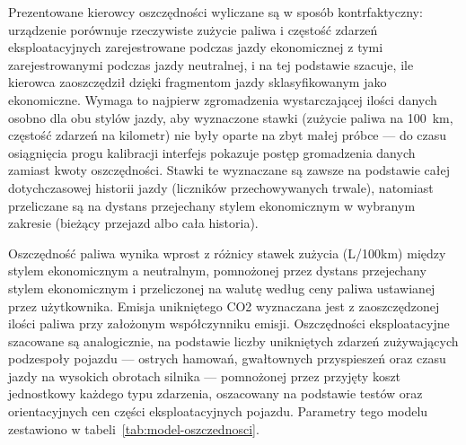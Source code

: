 Prezentowane kierowcy oszczędności wyliczane są w sposób kontrfaktyczny:
urządzenie porównuje rzeczywiste zużycie paliwa i częstość zdarzeń
eksploatacyjnych zarejestrowane podczas jazdy ekonomicznej z tymi
zarejestrowanymi podczas jazdy neutralnej, i na tej podstawie szacuje, ile
kierowca zaoszczędził dzięki fragmentom jazdy sklasyfikowanym jako
ekonomiczne. Wymaga to najpierw zgromadzenia wystarczającej ilości danych
osobno dla obu stylów jazdy, aby wyznaczone stawki (zużycie paliwa na
100~km, częstość zdarzeń na kilometr) nie były oparte na zbyt małej próbce
--- do czasu osiągnięcia progu kalibracji interfejs pokazuje postęp
gromadzenia danych zamiast kwoty oszczędności. Stawki te wyznaczane są
zawsze na podstawie całej dotychczasowej historii jazdy (liczników
przechowywanych trwale), natomiast przeliczane są na dystans przejechany
stylem ekonomicznym w wybranym zakresie (bieżący przejazd albo cała
historia).

Oszczędność paliwa wynika wprost z różnicy stawek zużycia (L/100km) między
stylem ekonomicznym a neutralnym, pomnożonej przez dystans przejechany
stylem ekonomicznym i przeliczonej na walutę według ceny paliwa ustawianej
przez użytkownika. Emisja unikniętego CO2 wyznaczana jest z zaoszczędzonej
ilości paliwa przy założonym współczynniku emisji. Oszczędności
eksploatacyjne szacowane są analogicznie, na podstawie liczby unikniętych
zdarzeń zużywających podzespoły pojazdu --- ostrych hamowań, gwałtownych
przyspieszeń oraz czasu jazdy na wysokich obrotach silnika --- pomnożonej
przez przyjęty koszt jednostkowy każdego typu zdarzenia, oszacowany na
podstawie testów oraz orientacyjnych cen części eksploatacyjnych pojazdu.
Parametry tego modelu zestawiono w tabeli~\ref{tab:model-oszczednosci}.

